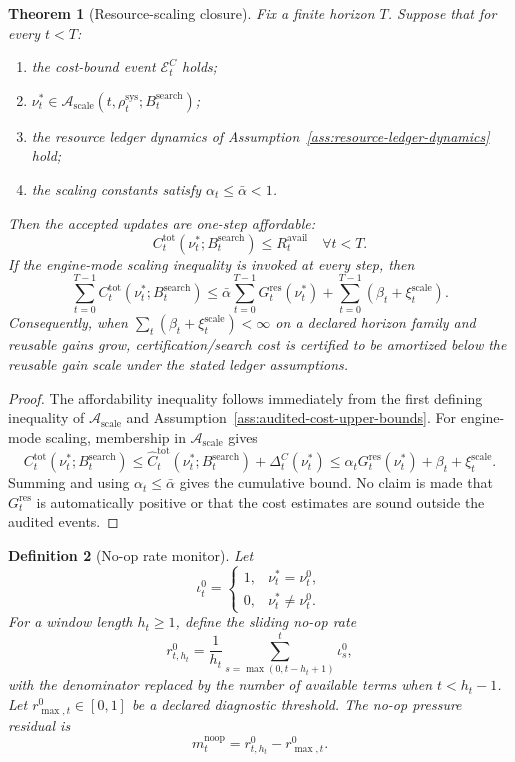 \documentclass[11pt,a4paper]{article}
\newtheorem{theorem}{Theorem}[section]
\newtheorem{definition}[theorem]{Definition}
\newcommand{\Acal}{\mathcal A}
\newcommand{\Ecal}{\mathcal E}
\newcommand{\sys}{\mathrm{sys}}
\newcommand{\search}{\mathrm{search}}
\newcommand{\scale}{\mathrm{scale}}
\newcommand{\noop}{\mathrm{noop}}
\newcommand{\tot}{\mathrm{tot}}
\newcommand{\avail}{\mathrm{avail}}
\newcommand{\res}{\mathrm{res}}
\begin{document}
\begin{theorem}[Resource-scaling closure]
\label{thm:resource-scaling-closure}
Fix a finite horizon \(T\). Suppose that for every \(t<T\):
\begin{enumerate}[label=(\alph*),leftmargin=1.5em]
    \item the cost-bound event \(\Ecal_t^C\) holds;
    \item \(\nu_t^*\in\Acal_{\scale}(t,\rho_t^{\sys};B_t^{\search})\);
    \item the resource ledger dynamics of Assumption~\ref{ass:resource-ledger-dynamics} hold;
    \item the scaling constants satisfy \(\alpha_t\le\bar\alpha<1\).
\end{enumerate}
Then the accepted updates are one-step affordable:
\[
C_t^{\tot}(\nu_t^*;B_t^{\search})\le R_t^{\avail}
\quad\forall t<T.
\]
If the engine-mode scaling inequality is invoked at every step, then
\[
\sum_{t=0}^{T-1} C_t^{\tot}(\nu_t^*;B_t^{\search})
\le
\bar\alpha \sum_{t=0}^{T-1}G_t^{\res}(\nu_t^*)
+
\sum_{t=0}^{T-1}(\beta_t+\xi_t^{\scale}).
\]
Consequently, when \(\sum_t(\beta_t+\xi_t^{\scale})<\infty\) on a declared horizon family and reusable gains grow, certification/search cost is certified to be amortized below the reusable gain scale under the stated ledger assumptions.
\end{theorem}

\begin{proof}
The affordability inequality follows immediately from the first defining inequality of \(\Acal_{\scale}\) and Assumption~\ref{ass:audited-cost-upper-bounds}. For engine-mode scaling, membership in \(\Acal_{\scale}\) gives
\[
C_t^{\tot}(\nu_t^*;B_t^{\search})
\le
\widehat C_t^{\tot}(\nu_t^*;B_t^{\search})+\Delta_t^C(\nu_t^*)
\le
\alpha_tG_t^{\res}(\nu_t^*)+\beta_t+\xi_t^{\scale}.
\]
Summing and using \(\alpha_t\le\bar\alpha\) gives the cumulative bound. No claim is made that \(G_t^{\res}\) is automatically positive or that the cost estimates are sound outside the audited events.
\end{proof}

\begin{definition}[No-op rate monitor]
\label{def:no-op-rate-monitor}
Let
\[
\iota_t^0=
\begin{cases}
1, & \nu_t^*=\nu_t^0,\\
0, & \nu_t^*\neq\nu_t^0.
\end{cases}
\]
For a window length \(h_t\ge1\), define the sliding no-op rate
\[
r_{t,h_t}^{0}
=
\frac{1}{h_t}\sum_{s=\max(0,t-h_t+1)}^{t}\iota_s^0,
\]
with the denominator replaced by the number of available terms when \(t<h_t-1\). Let \(r_{\max,t}^{0}\in[0,1]\) be a declared diagnostic threshold. The no-op pressure residual is
\[
m_t^{\noop}=r_{t,h_t}^{0}-r_{\max,t}^{0}.
\]
\end{definition}
\end{document}
